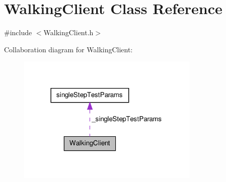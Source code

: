 \hypertarget{classWalkingClient}{\section{\-Walking\-Client \-Class \-Reference}
\label{classWalkingClient}
}


{\ttfamily \#include $<$\-Walking\-Client.\-h$>$}



\-Collaboration diagram for \-Walking\-Client\-:\nopagebreak
\begin{figure}[H]
\begin{center}
\leavevmode
\includegraphics[width=246pt]{classWalkingClient__coll__graph}
\end{center}
\end{figure}

